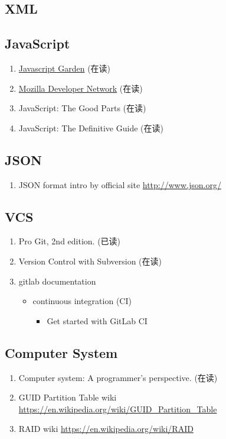 \documentclass{article}
\begin{document}
\subsection{XML}
%
\subsection{JavaScript}
\begin{enumerate}
    \item  \href{http://bonsaiden.github.io/JavaScript-Garden/}{Javascript Garden} (在读)
    \item \href{https://developer.mozilla.org/en-US/Learn}{Mozilla Developer Network} (在读)
    \item JavaScript: The Good Parts (在读)
    \item JavaScript: The Definitive Guide (在读)
\end{enumerate}
\subsection{JSON}
\begin{enumerate}
    \item JSON format intro by official site \url{http://www.json.org/}
\end{enumerate}
\subsection{VCS}
\begin{enumerate}
    \item Pro Git, 2nd edition. (已读)
    \item Version Control with Subversion (在读)
    \item gitlab documentation
        \begin{itemize}
            \item continuous integration (CI)
                \begin{itemize}
                    \item Get started with GitLab CI
                \end{itemize}
        \end{itemize}
\end{enumerate}
\subsection{Computer System}
\begin{enumerate}
    \item Computer system: A programmer's perspective. (在读)
    \item GUID Partition Table wiki \url{https://en.wikipedia.org/wiki/GUID_Partition_Table}
    \item RAID wiki \url{https://en.wikipedia.org/wiki/RAID}
\end{enumerate}
\end{document}
